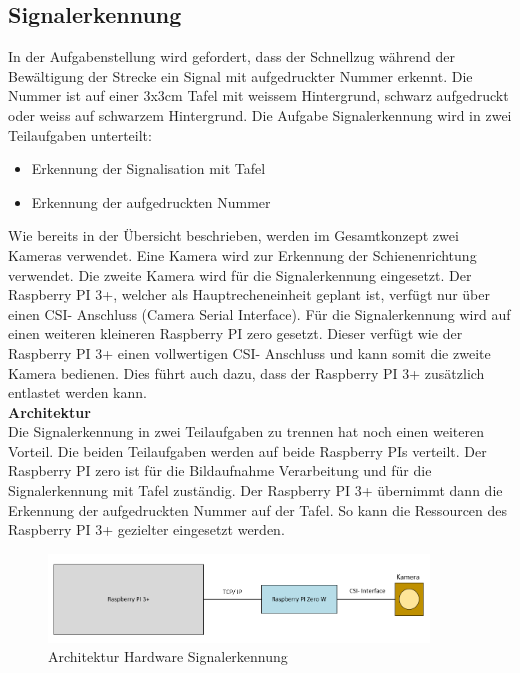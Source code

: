 \documentclass[../../main.tex]{subfiles}
\begin{document}
\subsection{Signalerkennung}
    In der Aufgabenstellung wird gefordert, dass der Schnellzug während der Bewältigung der Strecke ein Signal mit aufgedruckter Nummer erkennt. Die Nummer ist auf einer 3x3cm Tafel mit weissem Hintergrund, schwarz aufgedruckt oder weiss auf schwarzem Hintergrund. Die Aufgabe Signalerkennung wird in zwei Teilaufgaben unterteilt:
    \begin{itemize}
        \item Erkennung der Signalisation mit Tafel
        \item Erkennung der aufgedruckten Nummer
    \end{itemize}
    Wie bereits in der Übersicht beschrieben, werden im Gesamtkonzept zwei Kameras verwendet. Eine Kamera wird zur Erkennung der Schienenrichtung verwendet. Die zweite Kamera wird für die Signalerkennung eingesetzt. Der Raspberry PI 3+, welcher als Hauptrecheneinheit geplant ist, verfügt nur über einen CSI- Anschluss (Camera Serial Interface). Für die Signalerkennung wird auf einen weiteren kleineren Raspberry PI zero gesetzt. Dieser verfügt wie der Raspberry PI 3+ einen vollwertigen CSI- Anschluss und kann somit die zweite Kamera bedienen. Dies führt auch dazu, dass der Raspberry PI 3+ zusätzlich entlastet werden kann.\\

    \textbf{Architektur}\\
    Die Signalerkennung in zwei Teilaufgaben zu trennen hat noch einen weiteren Vorteil. Die beiden Teilaufgaben werden auf beide Raspberry PIs verteilt. Der Raspberry PI zero ist für die Bildaufnahme Verarbeitung und für die Signalerkennung mit Tafel zuständig. Der Raspberry PI 3+ übernimmt dann die Erkennung der aufgedruckten Nummer auf der Tafel. So kann die Ressourcen des Raspberry PI 3+ gezielter eingesetzt werden.

    \begin{figure}[H] %
        \centering
        \includegraphics[width=0.9\textwidth]{Architektur.png}
        \caption{Architektur Hardware Signalerkennung}
        \label{fig:architektur_hardware_signalerkennung}
    \end{figure}
\end{document}
